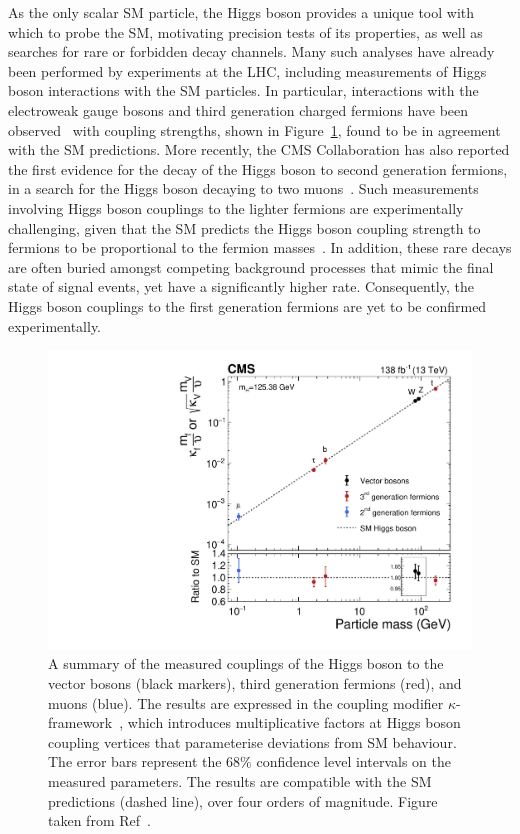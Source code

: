 As the only scalar SM particle, the Higgs boson provides a unique tool with which to probe the SM, motivating precision tests of its properties, as well as searches for rare or forbidden decay channels. Many such analyses have already been performed by experiments at the LHC, including measurements of Higgs boson interactions with the SM particles. In particular, interactions with the electroweak gauge bosons and third generation charged fermions have been observed~\cite{CMSttH,ATLASttH,CMSHbb,ATLASHbb,CMSHtautau,ATLASHtautau,HIG-19-015,CMS_HWW,CMS_HZZ,CMSHiggsNature,ATLAS_Hgg,ATLAS_HWW,ATLAS_HZZ,ATLAS_HComb} with coupling strengths, shown in Figure~\ref{fig:run_2_couplings}, found to be in agreement with the SM predictions.
More recently, the CMS Collaboration has also reported the first evidence for the decay of the Higgs boson to second generation fermions, in a search for the Higgs boson decaying to two muons~\cite{CMSHMuMu}. 
Such measurements involving Higgs boson couplings to the lighter fermions are experimentally challenging, given that the SM predicts the Higgs boson coupling strength to fermions to be proportional to the fermion masses~\cite{Glashow,Weinberg,Salam}. In addition, these rare decays are often buried amongst competing background processes that mimic the final state of signal events, yet have a significantly higher rate. Consequently, the Higgs boson couplings to the first generation fermions are yet to be confirmed experimentally.

\begin{figure}[htbp!]
\centering
\includegraphics[width =0.65\linewidth]{Figures/Introduction/CMS_couplings_Run2.pdf}\hfill
\caption[Measured couplings of the Higgs boson to vector bosons and fermions.]{A summary of the measured couplings of the Higgs boson to the vector bosons (black markers), third generation fermions (red), and muons (blue). The results are expressed in the coupling modifier $\kappa$-framework~\cite{YR3}, which introduces multiplicative factors at Higgs boson coupling vertices that parameterise deviations from SM behaviour. The error bars represent the 68\% confidence level intervals on the measured parameters. The results are compatible with the SM predictions (dashed line), over four orders of magnitude. Figure taken from Ref~\cite{CMSHiggsNature}. }%
\label{fig:run_2_couplings}
\end{figure}

